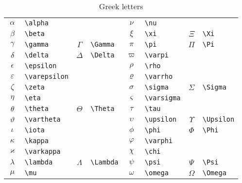 \documentclass[captions=tableheading]{scrartcl}
\begin{document}
\begin{table}
  \caption{Greek letters}
  \label{tab:greek-letters}
  \centering
  \begin{tabular}[c]{clcl@{\hskip 3em}clcl}
    \toprule
    $\alpha$ & \verb|\alpha| & & &
    $\nu$ & \verb|\nu| & & \\
    $\beta$ & \verb|\beta| & & &
    $\xi$ & \verb|\xi| & $\Xi$ & \verb|\Xi| \\
    $\gamma$ & \verb|\gamma| & $\Gamma$ & \verb|\Gamma| &
    $\pi$ & \verb|\pi| & $\Pi$ & \verb|\Pi| \\
    $\delta$ & \verb|\delta| & $\Delta$ & \verb|\Delta| &
    $\varpi$ & \verb|\varpi| & & \\
    $\epsilon$ & \verb|\epsilon| & & &
    $\rho$ & \verb|\rho| & & \\
    \addlinespace
    $\varepsilon$ & \verb|\varepsilon| & & &
    $\varrho$ & \verb|\varrho| & & \\
    $\zeta$ & \verb|\zeta| & & &
    $\sigma$ & \verb|\sigma| & $\Sigma$ & \verb|\Sigma| \\
    $\eta$ & \verb|\eta| & & &
    $\varsigma$ & \verb|\varsigma| & & \\
    $\theta$ & \verb|\theta| & $\Theta$ & \verb|\Theta| &
    $\tau$ & \verb|\tau| & & \\
    $\vartheta$ & \verb|\vartheta| & & &
    $\upsilon$ & \verb|\upsilon| & $\Upsilon$ & \verb|\Upsilon| \\
    \addlinespace
    $\iota$ & \verb|\iota| & & &
    $\phi$ & \verb|\phi| & $\Phi$ & \verb|\Phi| \\
    $\kappa$ & \verb|\kappa| & & &
    $\varphi$ & \verb|\varphi| & & \\
    $\varkappa$ & \verb|\varkappa| & & &
    $\chi$ & \verb|\chi| & & \\
    $\lambda$ & \verb|\lambda| & $\Lambda$ & \verb|\Lambda| &
    $\psi$ & \verb|\psi| & $\Psi$ & \verb|\Psi| \\
    $\mu$ & \verb|\mu| & & &
    $\omega$ & \verb|\omega| & $\Omega$ & \verb|\Omega| \\
    \bottomrule
  \end{tabular}
\end{table}
\end{document}
